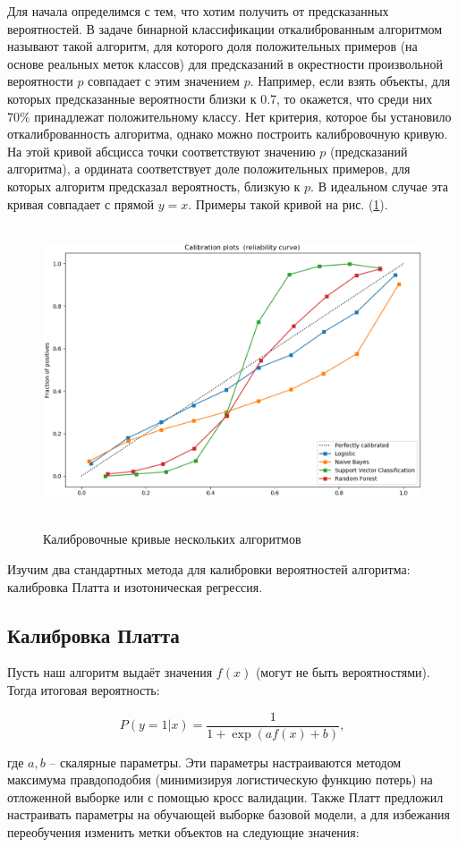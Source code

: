\documentclass[12pt,a4paper]{article}
\begin{document}
Для начала определимся с тем, что хотим получить от предсказанных вероятностей. В задаче бинарной классификации откалиброванным алгоритмом называют такой алгоритм, для которого доля положительных примеров (на основе реальных меток классов) для предсказаний в окрестности произвольной вероятности $p$ совпадает с этим значением $p$. Например, если взять объекты, для которых предсказанные вероятности близки к 0.7, то окажется, что среди них 70\% принадлежат положительному классу. Нет критерия, которое бы установило откалиброванность алгоритма, однако можно построить калибровочную кривую. На этой кривой абсцисса точки соответствуют значению $p$ (предсказаний алгоритма), а ордината соответствует доле положительных примеров, для которых алгоритм предсказал вероятность, близкую к $p$. В идеальном случае эта кривая совпадает с прямой $y = x$. Примеры такой кривой на рис. (\ref{fig:plot}).

\begin{center}
\begin{figure}[!htb]
 \centering
 \includegraphics[width=0.7\linewidth]{img/calibration_plot.eps}
 \caption{Калибровочные кривые нескольких алгоритмов}\label{fig:plot}
\end{figure}
\end{center}

Изучим два стандартных метода для калибровки вероятностей алгоритма: калибровка Платта и изотоническая регрессия.

\subsection{Калибровка Платта}

Пусть наш алгоритм выдаёт значения $f(x)$ (могут не быть вероятностями). Тогда итоговая вероятность:

$$P(y = 1 | x) = \frac{1}{1+\exp (af(x) + b)},$$

где $a, b$ -- скалярные параметры. Эти параметры настраиваются методом максимума правдоподобия (минимизируя логистическую функцию потерь) на отложенной выборке или с помощью кросс валидации. Также Платт предложил настраивать параметры на обучающей выборке базовой модели, а для избежания переобучения изменить метки объектов на следующие значения:
\end{document}
